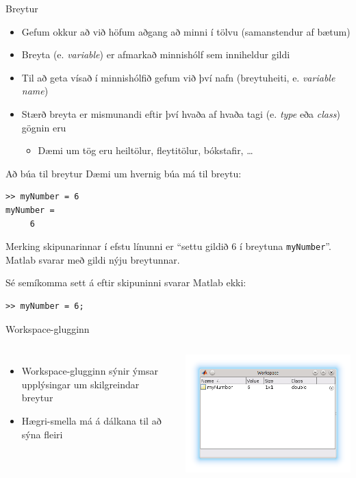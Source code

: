 \documentclass{beamer}
\begin{document}
\begin{frame}{Breytur}
\begin{itemize}
 \item Gefum okkur að við höfum aðgang að minni í tölvu (samanstendur af bætum)
 \item Breyta (e. \emph{variable}) er afmarkað minnishólf sem inniheldur gildi
 \item Til að geta vísað í minnishólfið gefum við því nafn (breytuheiti, e. \emph{variable name})
 \item Stærð breyta er mismunandi eftir því hvaða af hvaða tagi (e. \emph{type} eða \emph{class}) gögnin eru
 \begin{itemize}
  \item Dæmi um tög eru heiltölur, fleytitölur, bókstafir, \ldots
 \end{itemize}
\end{itemize}
\end{frame}

\begin{frame}[fragile]{Að búa til breytur}
Dæmi um hvernig búa má til breytu:
\begin{verbatim}
>> myNumber = 6
myNumber =  
     6
\end{verbatim}
Merking skipunarinnar í efstu línunni er ``settu gildið $6$ í breytuna \texttt{myNumber}''. Matlab svarar með gildi nýju breytunnar.

Sé semíkomma sett á eftir skipuninni svarar Matlab ekki:
\begin{verbatim}
>> myNumber = 6;
\end{verbatim}
\end{frame}

\begin{frame}{Workspace-glugginn}
\begin{columns}
\begin{itemize}
 \item Workspace-glugginn sýnir ýmsar upplýsingar um skilgreindar breytur
 \item Hægri-smella má á dálkana til að sýna fleiri
\end{itemize}
\includegraphics[width=\linewidth]{Pics/workspace-window}
\end{columns}
\end{frame}
\end{document}
